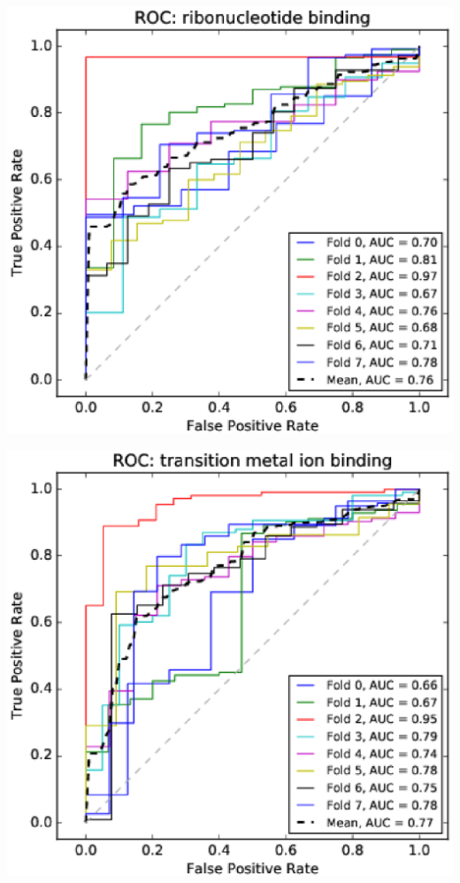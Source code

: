 \documentclass[11pt,twoside,a4paper]{book}
\newenvironment{Figure}
  {\par\medskip\noindent\minipage{\linewidth}}
  {\endminipage\par\medskip}
\begin{document}
\begin{multicols}{2}
\begin{Figure}\begin{center}\includegraphics[width=\linewidth]{figures/roc_ribonucleotide_binding}\label{fig:roc_ribonucleotide_binding}\end{center}\end{Figure}
\begin{Figure}\begin{center}\includegraphics[width=\linewidth]{figures/roc_transition_metal_ion_binding}\label{fig:roc_transition_metal_ion_binding}\end{center}\end{Figure}

\end{multicols}
\end{document}
